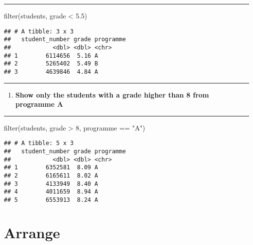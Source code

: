 \documentclass[
]{article}
\newenvironment{Shaded}{\begin{snugshade}}{\end{snugshade}}
\newcommand{\DecValTok}[1]{\textcolor[rgb]{0.00,0.00,0.81}{#1}}
\newcommand{\FloatTok}[1]{\textcolor[rgb]{0.00,0.00,0.81}{#1}}
\newcommand{\FunctionTok}[1]{\textcolor[rgb]{0.00,0.00,0.00}{#1}}
\newcommand{\NormalTok}[1]{#1}
\newcommand{\SpecialCharTok}[1]{\textcolor[rgb]{0.00,0.00,0.00}{#1}}
\newcommand{\StringTok}[1]{\textcolor[rgb]{0.31,0.60,0.02}{#1}}
\providecommand{\tightlist}{%
  \setlength{\itemsep}{0pt}\setlength{\parskip}{0pt}}
\begin{document}
\begin{center}\rule{0.5\linewidth}{0.5pt}\end{center}

\begin{Shaded}
\begin{Highlighting}[]
\FunctionTok{filter}\NormalTok{(students, grade }\SpecialCharTok{\textless{}} \FloatTok{5.5}\NormalTok{)}
\end{Highlighting}
\end{Shaded}

\begin{verbatim}
## # A tibble: 3 x 3
##   student_number grade programme
##            <dbl> <dbl> <chr>    
## 1        6114656  5.16 A        
## 2        5265402  5.49 B        
## 3        4639846  4.84 A
\end{verbatim}

\begin{center}\rule{0.5\linewidth}{0.5pt}\end{center}

\begin{enumerate}
\def\labelenumi{\arabic{enumi}.}
\setcounter{enumi}{11}
\tightlist
\item
  \textbf{Show only the students with a grade higher than 8 from
  programme A}
\end{enumerate}

\begin{center}\rule{0.5\linewidth}{0.5pt}\end{center}

\begin{Shaded}
\begin{Highlighting}[]
\FunctionTok{filter}\NormalTok{(students, grade }\SpecialCharTok{\textgreater{}} \DecValTok{8}\NormalTok{, programme }\SpecialCharTok{==} \StringTok{"A"}\NormalTok{)}
\end{Highlighting}
\end{Shaded}

\begin{verbatim}
## # A tibble: 5 x 3
##   student_number grade programme
##            <dbl> <dbl> <chr>    
## 1        6352581  8.09 A        
## 2        6165611  8.02 A        
## 3        4133949  8.40 A        
## 4        4011659  8.94 A        
## 5        6553913  8.24 A
\end{verbatim}

\hypertarget{arrange}{%
\section{Arrange}\label{arrange}}
\end{document}
